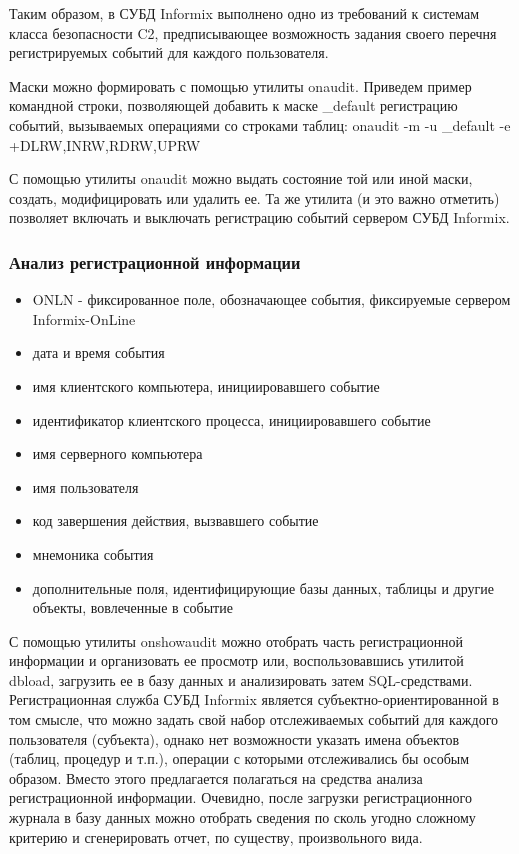 Таким образом, в СУБД Informix выполнено одно из требований к системам класса безопасности C2, предписывающее возможность задания своего перечня регистрируемых событий для каждого пользователя.

Маски можно формировать с помощью утилиты onaudit. Приведем пример командной строки, позволяющей добавить к маске \_default регистрацию событий, вызываемых операциями со строками таблиц:
onaudit -m -u \_default -e +DLRW,INRW,RDRW,UPRW

С помощью утилиты onaudit можно выдать состояние той или иной маски, создать, модифицировать или удалить ее. Та же утилита (и это важно отметить) позволяет включать и выключать регистрацию событий сервером СУБД Informix.

\subsubsection{Анализ регистрационной информации}
\begin{itemize}
    \item ONLN - фиксированное поле, обозначающее события, фиксируемые сервером Informix-OnLine
    \item дата и время события
    \item имя клиентского компьютера, инициировавшего событие
    \item идентификатор клиентского процесса, инициировавшего событие
    \item имя серверного компьютера
    \item имя пользователя
    \item код завершения действия, вызвавшего событие
    \item мнемоника события
    \item дополнительные поля, идентифицирующие базы данных, таблицы и другие объекты, вовлеченные в событие
\end{itemize}

С помощью утилиты onshowaudit можно отобрать часть регистрационной информации и организовать ее просмотр или, воспользовавшись утилитой dbload, загрузить ее в базу данных и анализировать затем SQL-средствами. Регистрационная служба СУБД Informix является субъектно-ориентированной в том смысле, что можно задать свой набор отслеживаемых событий для каждого пользователя (субъекта), однако нет возможности указать имена объектов (таблиц, процедур и т.п.), операции с которыми отслеживались бы особым образом. Вместо этого предлагается полагаться на средства анализа регистрационной информации. Очевидно, после загрузки регистрационного журнала в базу данных можно отобрать сведения по сколь угодно сложному критерию и сгенерировать отчет, по существу, произвольного вида.

